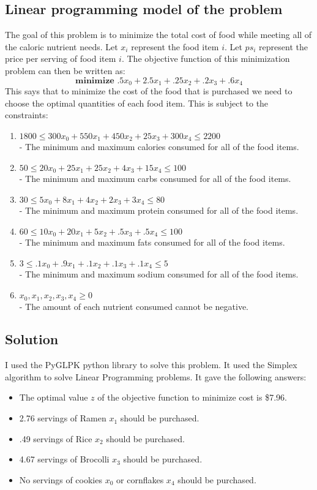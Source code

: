 \documentclass[12pt]{article}
\begin{document}
\subsection*{Linear programming model of the problem}
The goal of this problem is to minimize the total cost of food while meeting all of the caloric nutrient needs.  Let $x_{i}$ represent the food item $i$.  Let $ps_{i}$ represent the price per serving of food item $i$.  The objective function of this minimization problem can then be written as:
$$
  \textbf{minimize } .5x_{0} + 2.5x_{1} + .25x_{2} + .2x_{3} + .6x_{4}
$$
This says that to minimize the cost of the food that is purchased we need to choose the optimal quantities of each food item.  This is subject to the constraints:
\begin{enumerate}
\itemsep0em
  \item $1800 \leq 300x_{0} + 550x_{1} + 450x_{2} + 25x_{3} + 300x_{4} \leq 2200$\\
  - The minimum and maximum calories consumed for all of the food items.
  \item $50 \leq 20x_{0} + 25x_{1} + 25x_{2} + 4x_{3} + 15x_{4} \leq 100$\\
  - The minimum and maximum carbs consumed for all of the food items.
  \item $30 \leq 5x_{0} + 8x_{1} + 4x_{2} + 2x_{3} + 3x_{4} \leq 80$\\
  - The minimum and maximum protein consumed for all of the food items.
  \item $60 \leq 10x_{0} + 20x_{1} + 5x_{2} + .5x_{3} + .5x_{4} \leq 100$\\
  - The minimum and maximum fats consumed for all of the food items.
  \item $3 \leq .1x_{0} + .9x_{1} + .1x_{2} + .1x_{3} + .1x_{4} \leq 5$\\
  - The minimum and maximum sodium consumed for all of the food items.
  \item $x_{0}, x_{1}, x_{2}, x_{3}, x_{4} \geq 0$\\
  - The amount of each nutrient consumed cannot be negative.
\end{enumerate}

\subsection*{Solution}
I used the PyGLPK python library to solve this problem.  It used the Simplex algorithm to solve Linear Programming problems.  It gave the following answers:
\begin{itemize}
  \item The optimal value $z$ of the objective function to minimize cost is \$7.96.
  \item 2.76 servings of Ramen $x_{1}$ should be purchased.
  \item .49 servings of Rice $x_{2}$ should be purchased.
  \item 4.67 servings of Brocolli $x_{3}$ should be purchased.
  \item No servings of cookies $x_{0}$ or cornflakes $x_{4}$ should be purchased.
\end{itemize}
\end{document}
